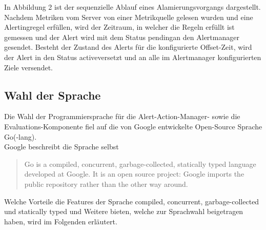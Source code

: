 \documentclass[a4paper,10pt]{scrartcl}
\begin{document}
In Abbildung 2 ist der sequenzielle Ablauf eines Alamierungsvorgangs dargestellt. Nachdem Metriken vom Server von einer Metrikquelle gelesen wurden und eine Alertingregel erfüllen, wird der Zeitraum, in welcher die Regeln erfüllt ist gemessen und der Alert wird mit dem Status \glqq pending\grqq an den Alertmanager gesendet. Besteht der Zustand des Alerts für die konfigurierte Offset-Zeit, wird der Alert in den Status \grqq active\grqq versetzt und an alle im Alertmanager konfigurierten Ziele versendet.

\subsection{Wahl der Sprache}

Die Wahl der Programmiersprache für die \glqq Alert-Action-Manager\grqq- sowie die Evaluations-Komponente fiel auf die von Google entwickelte Open-Source Sprache Go(-lang).\\
Google beschreibt die Sprache selbst
\begin{quote}Go is a compiled, concurrent, garbage-collected, statically typed language developed at Google. It is an open source project: Google imports the public repository rather than the other way around.~\cite{Tien.2019}\end{quote}
Welche Vorteile die Features der Sprache compiled, concurrent, garbage-collected und statically typed und Weitere bieten, welche zur Sprachwahl beigetragen haben, wird im Folgenden erläutert.
\end{document}
